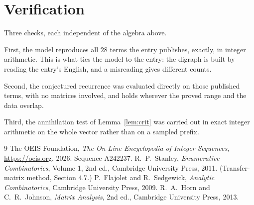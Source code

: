 \documentclass[11pt,a4paper]{article}
\theoremstyle{plain}
\theoremstyle{definition}
\begin{document}
\section{Verification}

Three checks, each independent of the algebra above.

First, the model reproduces all $28$ terms the entry publishes, exactly, in integer
arithmetic. This is what ties the model to the entry: the digraph is built by reading the
entry's English, and a misreading gives different counts.

Second, the conjectured recurrence was evaluated directly on those published terms, with no
matrices involved, and holds wherever the proved range and the data overlap.

Third, the annihilation test of Lemma~\ref{lem:crit} was carried out in exact integer
arithmetic on the whole vector rather than on a sampled prefix.

\begin{thebibliography}{9}
 The OEIS Foundation, \emph{The On-Line Encyclopedia of Integer
Sequences}, \url{https://oeis.org}, 2026. Sequence A242237.
 R.~P.~Stanley, \emph{Enumerative Combinatorics}, Volume 1, 2nd ed.,
Cambridge University Press, 2011. (Transfer-matrix method, Section 4.7.)
 P.~Flajolet and R.~Sedgewick, \emph{Analytic Combinatorics}, Cambridge
University Press, 2009.
 R.~A.~Horn and C.~R.~Johnson, \emph{Matrix Analysis}, 2nd ed., Cambridge
University Press, 2013.
\end{thebibliography}
\end{document}

